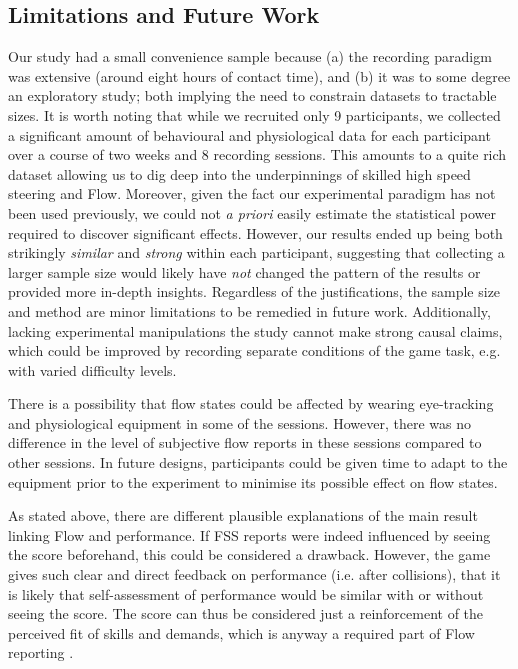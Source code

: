 \documentclass{frontierstyle/frontiersSCNS}
\newcommand{\hl}{\textcolor{red!80}}
\begin{document}
\subsection{Limitations and Future Work}
Our study had a small convenience sample because (a) the recording paradigm was extensive (around eight hours of contact time), and (b) it was to some degree an exploratory study; both implying the need to constrain datasets to tractable sizes. It is worth noting that while we recruited only 9 participants, we collected a significant amount of behavioural and physiological data for each participant over a course of two weeks and 8 recording sessions. This amounts to a quite rich dataset allowing us to dig deep into the underpinnings of skilled high speed steering and Flow. Moreover, given the fact our experimental paradigm has not been used previously, we could not {\it a priori} easily estimate the statistical power required to discover significant effects. However, our results ended up being both strikingly {\it similar} and {\it strong} within each participant, suggesting that collecting a larger sample size would likely have {\it not} changed the pattern of the results or provided more in-depth insights. Regardless of the justifications, the sample size and method are minor limitations to be remedied in future work. Additionally, lacking experimental manipulations the study cannot make strong causal claims, which could be improved by recording separate conditions of the game task, e.g. with varied difficulty levels.

\hl{There is a possibility that flow states could be affected by wearing eye-tracking and physiological equipment in some of the sessions. However, there was no difference in the level of subjective flow reports in these sessions compared to other sessions. In future designs, participants could be given time to adapt to the equipment prior to the experiment to minimise its possible effect on flow states.}

As stated above, there are different plausible explanations of the main result linking Flow and performance. If FSS reports were indeed influenced by seeing the score beforehand, this could be considered a drawback. However, the game gives such clear and direct feedback on performance (i.e. after collisions), that it is likely that self-assessment of performance would be similar with or without seeing the score. The score can thus be considered just a reinforcement of the perceived fit of skills and demands, which is anyway a required part of Flow reporting \citep{Keller2012}.
\end{document}
